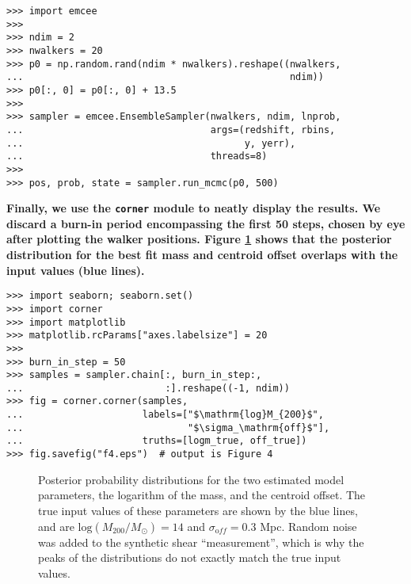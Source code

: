 \documentclass[twocolumn]{aastex6}
\newcommand{\code}{\lstinline[style=codeintext]}
\begin{document}
\begin{verbatim}
>>> import emcee
>>> 
>>> ndim = 2
>>> nwalkers = 20
>>> p0 = np.random.rand(ndim * nwalkers).reshape((nwalkers, 
...                                               ndim))
>>> p0[:, 0] = p0[:, 0] + 13.5
>>> 
>>> sampler = emcee.EnsembleSampler(nwalkers, ndim, lnprob,
...                                 args=(redshift, rbins, 
...                                       y, yerr), 
...                                 threads=8)
>>> 
>>> pos, prob, state = sampler.run_mcmc(p0, 500)
\end{verbatim}

{\bf Finally, we use the \code{corner} module \citep{corner} to neatly display the results. We discard a burn-in period encompassing the first 50 steps, chosen by eye after plotting the walker positions. Figure \ref{f4} shows that the posterior distribution for the best fit mass and centroid offset overlaps with the input values (blue lines).}

\pagebreak

\begin{verbatim}
>>> import seaborn; seaborn.set()
>>> import corner
>>> import matplotlib
>>> matplotlib.rcParams["axes.labelsize"] = 20
>>> 
>>> burn_in_step = 50
>>> samples = sampler.chain[:, burn_in_step:, 
...                         :].reshape((-1, ndim))
>>> fig = corner.corner(samples,
...                     labels=["$\mathrm{log}M_{200}$", 
...                             "$\sigma_\mathrm{off}$"],
...                     truths=[logm_true, off_true])
>>> fig.savefig("f4.eps")  # output is Figure 4
\end{verbatim}
\begin{figure}
\caption{Posterior probability distributions for the two estimated model parameters, the logarithm of the mass, and the centroid offset. The true input values of these parameters are shown by the blue lines, and are $\mathrm{log}(M_{200}/M_{\odot}) = 14$ and $\sigma_{\mathrm off} = 0.3$ Mpc. Random noise was added to the synthetic shear ``measurement'', which is why the peaks of the distributions do not exactly match the true input values.}
\label{f4}
\end{figure}

\end{document}
